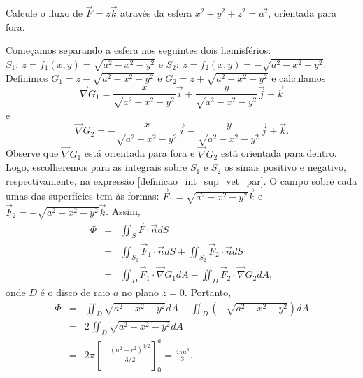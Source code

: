 \begin{resol}
\begin{itemize}
 
 \end{itemize}

\end{resol}

\begin{exeresol} Calcule o fluxo de $\vec{F}=z\vec{k}$ através da esfera $x^2+y^2+z^2= a^2$, orientada para fora. \end{exeresol}
\begin{resol}
Começamos separando a esfera nos seguintes dois hemisférios: $S_1:\ \!z=f_1(x,y)=\sqrt{ a^2-x^2-y^2}$ e $S_2:\ \!z=f_2(x,y)=-\sqrt{ a^2-x^2-y^2}$. Definimos $G_1=z-\sqrt{ a^2-x^2-y^2}$ e $G_2=z+\sqrt{ a^2-x^2-y^2}$ e calculamos 
$$
\vec{\nabla}G_1=\frac{x}{\sqrt{a^2-x^2-y^2}}\vec{i}+\frac{y}{\sqrt{a^2-x^2-y^2}}\vec{j}+\vec{k}
$$
e 
$$
\vec{\nabla}G_2=-\frac{x}{\sqrt{a^2-x^2-y^2}}\vec{i}-\frac{y}{\sqrt{a^2-x^2-y^2}}\vec{j}+\vec{k}.
$$
Observe que $\vec{\nabla}G_1$ está orientada para fora e $\vec{\nabla}G_2$ está orientada para dentro. Logo, escolheremos para as integrais sobre $S_1$ e $S_2$ os sinais positivo e negativo, respectivamente, na expressão \eqref{definicao_int_sup_vet_par}. O campo sobre cada umas das superfícies tem às formas: $\vec{F}_1=\sqrt{ a^2-x^2-y^2}\vec{k}$ e $\vec{F}_2=-\sqrt{ a^2-x^2-y^2}\vec{k}$. Assim,
\begin{eqnarray*}
 \Phi&=&\iint_S\vec{F}\cdot \vec{n}dS\\
 &=&\iint_{S_1}\vec{F}_1\cdot \vec{n}dS+\iint_{S_2}\vec{F}_2\cdot \vec{n}dS\\
&=&\iint_{D}\vec{F}_1\cdot \vec{\nabla}G_1 dA-\iint_{D}\vec{F}_2\cdot \vec{\nabla}G_2 dA,
 \end{eqnarray*}
onde $D$ é o disco de raio $a$ no plano $z=0$. Portanto,
\begin{eqnarray*}
 \Phi&=&\iint_{D}\sqrt{ a^2-x^2-y^2} dA-\iint_{D}(-\sqrt{ a^2-x^2-y^2}) dA\\
 &=&2\iint_{D}\sqrt{ a^2-x^2-y^2} dA\\
 &=&2\pi \left[- \frac{(a^2-r^2)^{3/2}}{3/2}\right]_{0}^a=\frac{4\pi a^3}{3}.\\
 \end{eqnarray*}
\end{resol}

